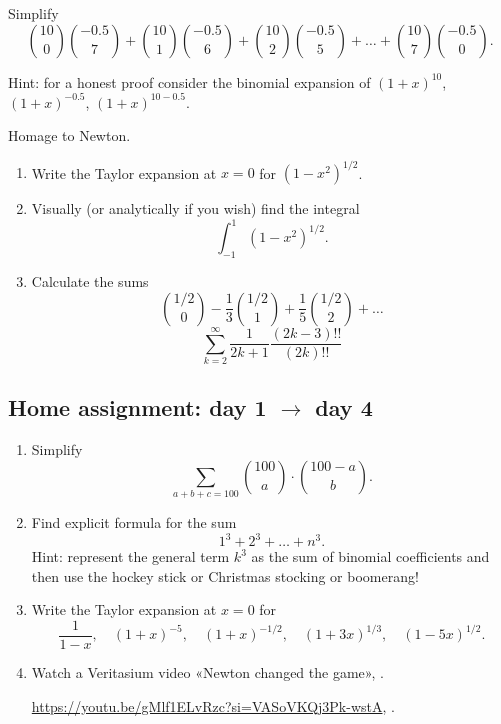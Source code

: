 \documentclass[12pt]{article}
\begin{document}
\begin{exercise}
Simplify 
\[
{10 \choose 0}{-0.5 \choose 7} + {10 \choose 1}{-0.5 \choose 6} + {10 \choose 2}{-0.5 \choose 5} + \dots + {10 \choose 7}{-0.5 \choose 0}.
\]

Hint: for a honest proof consider the binomial expansion of $(1+x)^10$, $(1+x)^{-0.5}$, $(1+x)^{10-0.5}$.
\end{exercise}


\begin{exercise}
Homage to Newton. 

\begin{enumerate}[label=\alph*)]
\item Write the Taylor expansion at $x=0$ for $(1 - x^2)^{1/2}$.
\item Visually (or analytically if you wish) find the integral
\[
\int_{-1}^1 (1 - x^2)^{1/2}.
\]

\item Calculate the sums
\[
{1/2 \choose 0} - \frac{1}{3}{1/2 \choose 1} + \frac{1}{5} {1/2 \choose 2} + \dots
\]
\[
\sum_{k=2}^{\infty} \frac{1}{2k+1} \frac{(2k - 3)!!}{(2k)!!}
\]
\end{enumerate}
\end{exercise}



\subsection*{Home assignment: day 1 $\to$ day 4}

\begin{enumerate}
    \item Simplify
\[
\sum_{a + b + c = 100} {100 \choose a} \cdot {100-a \choose b}.
\]
    \item Find explicit formula for the sum 
    \[
    1^3 + 2^3 + \dots + n^3.
    \]
    Hint: represent the general term $k^3$ as the sum of binomial coefficients and then use the hockey stick or Christmas stocking or boomerang!

 
    \item Write the Taylor expansion at $x = 0$ for 
\[
\frac{1}{1 - x}, \quad  (1 + x)^{-5}, \quad  (1 + x)^{-1/2}, \quad  
(1 + 3x)^{1/3}, \quad  (1 - 5x)^{1/2}.
\]

    \item Watch a Veritasium video «Newton changed the game», \cite{veritasium2025newton}.

    \url{https://youtu.be/gMlf1ELvRzc?si=VASoVKQj3Pk-wstA},
    .
\end{enumerate}
\end{document}
